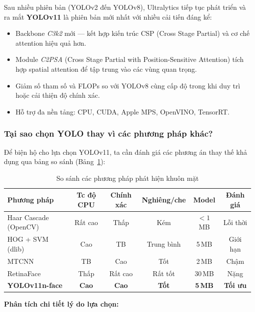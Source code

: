\medskip
Sau nhiều phiên bản (YOLOv2 đến YOLOv8), Ultralytics tiếp tục phát triển và ra mắt \textbf{YOLOv11} \cite{ultralytics2024} là phiên bản mới nhất với nhiều cải tiến đáng kể:
\begin{itemize}
    \item Backbone \textit{C3k2} mới --- kết hợp kiến trúc CSP (Cross Stage Partial) và cơ chế attention hiệu quả hơn.
    \item Module \textit{C2PSA} (Cross Stage Partial with Position-Sensitive Attention) tích hợp spatial attention để tập trung vào các vùng quan trọng.
    \item Giảm số tham số và FLOPs so với YOLOv8 cùng cấp độ trong khi duy trì hoặc cải thiện độ chính xác.
    \item Hỗ trợ đa nền tảng: CPU, CUDA, Apple MPS, OpenVINO, TensorRT.
\end{itemize}

\subsubsection{Tại sao chọn YOLO thay vì các phương pháp khác?}
\label{subsubsec:whyyolo}

Để biện hộ cho lựa chọn YOLOv11, ta cần đánh giá các phương án thay thế khả dụng qua bảng so sánh (Bảng~\ref{tab:detector_compare}):

\begin{table}[H]
\centering
\caption{So sánh các phương pháp phát hiện khuôn mặt}
\label{tab:detector_compare}
{\small
\begin{tabular}{|l|c|c|c|c|c|}
\hline
\textbf{Phương pháp} & \textbf{Tc độ CPU} & \textbf{Chính xác} & \textbf{Nghiêng/che} & \textbf{Model} & \textbf{Đánh giá} \\
\hline
Haar Cascade (OpenCV) & Rất cao & Thấp & Kém & $<1$\,MB & Lỗi thời \\
\hline
HOG + SVM (dlib) & Cao & TB & Trung bình & 5\,MB & Giới hạn \\
\hline
MTCNN & TB & Cao & Tốt & 2\,MB & Chậm \\
\hline
RetinaFace & Thấp & Rất cao & Rất tốt & 30\,MB & Nặng \\
\hline
\textbf{YOLOv11n-face} & \textbf{Cao} & \textbf{Cao} & \textbf{Tốt} & \textbf{5\,MB} & \textbf{Tối ưu} \\
\hline
\end{tabular}
}
\end{table}

\textbf{Phân tích chi tiết lý do lựa chọn:}

